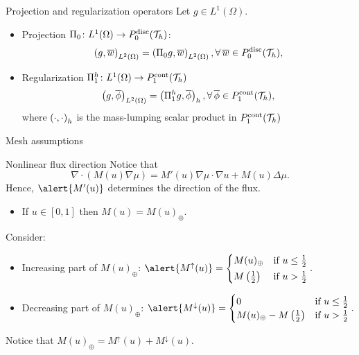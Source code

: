 \begin{frame}{Projection and regularization operators}
	Let $g\in L^1(\Omega)$.

	\begin{itemize}
		\item Projection $\Pi_0\colon L^1(\Omega) \rightarrow \relax{P}^{\text{disc}}_0(\mathcal{T}_h)$:
		\begin{equation*}
			\left(g,\overline{w}\right)_{L^2(\Omega)}=
			\left(\Pi_0 g,\overline{w}\right)_{L^2(\Omega)},\forall\,\overline{w}\in \relax{P}^{\text{disc}}_0(\mathcal{T}_h),
		\end{equation*}
		\item Regularization $\Pi^h_1\colon L^1(\Omega)\rightarrow \relax{P}^{\text{cont}}_1(\mathcal{T}_h)$
		\begin{equation*}
			\left(g,\overline{\phi}\right)_{L^2(\Omega)}=\left(\Pi^h_1 g,\overline{\phi}\right)_h,\forall\,\overline{\phi}\in \relax{P}^{\text{cont}}_1(\mathcal{T}_h),
		\end{equation*}
		where $\left(\cdot,\cdot\right)_h$ is the mass-lumping scalar product in $\relax{P}^{\text{cont}}_1(\mathcal{T}_h)$
	\end{itemize}
\end{frame}

\begin{frame}{Mesh assumptions}
\end{frame}

\begin{frame}{Nonlinear flux direction}
	\footnotesize
	Notice that
	$$\nabla\cdot(M(u)\nabla\mu)=M'(u)\nabla\mu \cdot\nabla u+M(u)\Delta\mu.$$
	Hence, $\alert{M'(u)}$ determines the direction of the flux.
	
	\vspace*{0.3cm}
	\begin{itemize}
		\item If $u\in[0,1]$ then $M(u)=M(u)_\oplus$.
	\end{itemize}
	\vspace*{0.3cm}
	
	Consider:
	\begin{itemize}
		\item Increasing part of $M(u)_\oplus$: $\alert{M^\uparrow(u)}=
		\begin{cases}
			M(u)_{\oplus} & \text{if }u\le \frac{1}{2}\\[0.2em]
			M\left(\frac{1}{2}\right) & \text{if } u>\frac{1}{2}
		\end{cases}.$
		\item Decreasing part of $M(u)_\oplus$: $
		\alert{M^\downarrow(u)}=
		\begin{cases}
			0 & \text{if }u\le \frac{1}{2}\\
			M(u)_{\oplus}-M\left(\frac{1}{2}\right) & \text{if } u>\frac{1}{2}
		\end{cases}.$
	\end{itemize}
	Notice that $M(u)_\oplus=M^\uparrow(u)+M^\downarrow(u)$.
\end{frame}

